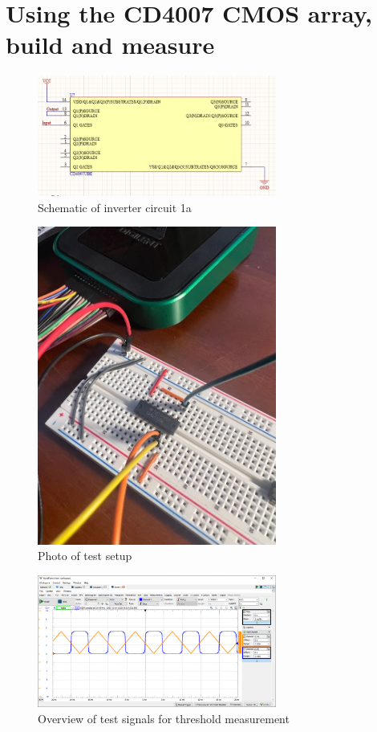 \documentclass{article}
\begin{document}
	\section{Using the CD4007 CMOS array, build and measure}
	
	\begin{figure}[H]
	    \centering
	    \includegraphics[width=0.7\textwidth]{2a-lab}
	    \caption{Schematic of inverter circuit 1a}
	\end{figure}

	\begin{figure}[H]
	    \centering
	    \includegraphics[width=0.7\textwidth]{2a-photo}
	    \caption{Photo of test setup}
	\end{figure}
	
	\begin{figure}[H]
	    \centering
	    \includegraphics[width=0.7\textwidth]{2a-1-lab}
	    \caption{Overview of test signals for threshold measurement}
	\end{figure}
	
\end{document}
